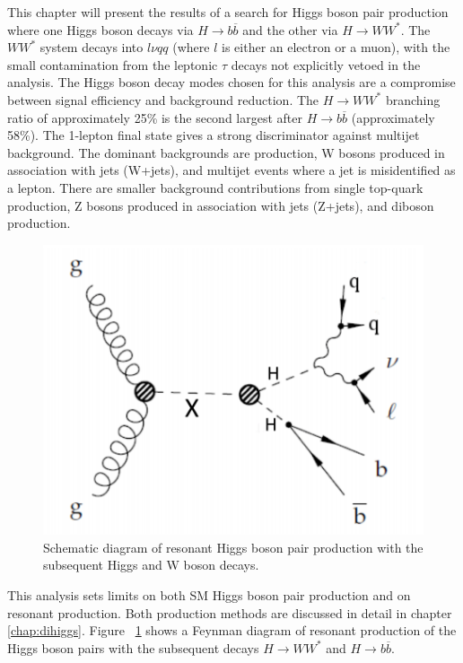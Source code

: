 This chapter will present the results of a search for Higgs boson pair production where one Higgs boson decays via ${H\rightarrow b\overline{b}}$ and the other via ${H\rightarrow WW^{*}}$. The ${WW^{*}}$ system decays into ${l\nu qq}$ (where ${l}$ is either an electron or a muon), with the small contamination from the leptonic ${\tau}$ decays not explicitly vetoed in the analysis. The Higgs boson decay modes chosen for this analysis are a compromise between signal efficiency and background reduction. The ${H\rightarrow WW^{*}}$ branching ratio of approximately 25\% is the second largest after ${H\rightarrow b\overline{b}}$ (approximately 58\%). The 1-lepton final state gives a strong discriminator against multijet background. The dominant backgrounds are \ttbar{} production, W bosons produced in association with jets (W+jets), and multijet events where a jet is misidentified as a lepton. There are smaller background  contributions from single top-quark production, Z bosons produced in association with jets (Z+jets), and diboson production.\newline

\begin{figure}[h]
\begin{center}
\includegraphics[scale=0.65]{figures/res_prod}
\caption{Schematic diagram of resonant Higgs boson pair production with the subsequent Higgs and W boson
decays.}
\end{center}
\label{fig:res}
\end{figure}

\indent This analysis sets limits on both SM Higgs boson pair production and on resonant production. Both production methods are discussed in detail in chapter \ref{chap:dihiggs}. Figure ~\ref{fig:res} shows a Feynman diagram of resonant production of the Higgs boson pairs with the subsequent decays ${H\rightarrow WW^{*}}$ and ${H\rightarrow b\overline{b}}$.
